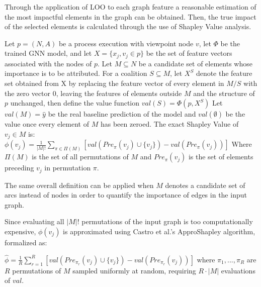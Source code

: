            Through the application of LOO to each graph feature a reasonable estimation of the most impactful elements in the graph can be obtained. 
            Then, the true impact of the selected elements is calculated through the use of Shapley Value analysis.

            \begin{definition}
            \label{def:Shap_Full}
                Let $p=(N,A)$ be a process execution with viewpoint node $v$, let $\Phi$ be the trained GNN model, and let $X=\{x_j,v_j \in p\}$ be the set of feature vectors associated with the nodes of $p$. Let $M \subseteq N$ be a candidate set of elements whose importance is to be attributed. For a coalition $S\subseteq M$, let $X^S$ denote the feature set obtained from X by replacing the feature vector of every element in $M/S$ with the zero vector $0$, leaving the features of elements outside $M$ and the structure of $p$ unchanged, then define the value function
                $val(S) = \Phi(p,X^S)$
                Let $val(M)=\hat{y}$ be the real baseline prediction of the model and $val(\emptyset)$ be the value once every element of $M$ has been zeroed.
                The exact Shapley Value of $v_j \in M$ is:
                $\phi(v_j) = \frac{1}{|M|!} \displaystyle \sum_{\pi \in \Pi(M)}[val(Pre_{\pi}(v_j) \cup \{v_j\}) - val(Pre_{\pi}(v_j))]$
                Where $\Pi(M)$ is the set of all permutations of $M$ and $Pre_{\pi}(v_j)$ is the set of elements preceding $v_j$ in permutation $\pi$.
            \end{definition}

            The same overall definition can be applied when $M$ denotes a candidate set of arcs instead of nodes in order to quantify the importance of edges in the input graph.

            Since evaluating all $|M|!$ permutations of the input graph is too computationally expensive, $\phi(v_j)$ is approximated using Castro et al.'s ApproShapley algorithm, formalized as:

            \begin{definition}
            \label{def:Shapley_approx}
                $\hat{\phi} = \frac{1}{R}\displaystyle \sum_{r=1}^{R}[val(Pre_{\pi_r}(v_j)\cup \{v_j\}) - val(Pre_{\pi_r}(v_j))]$
                where $\pi_1,...,\pi_R$ are $R$ permutations of $M$ sampled uniformly at random, requiring $R \cdot |M|$ evaluations of $val$.
            \end{definition}

